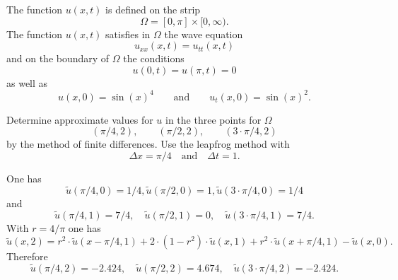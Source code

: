 The function $u(x,t)$ is defined on the strip 
\[
\Omega = [0, \pi] \times [0,\infty).
\]
The function $u(x,t)$ satisfies in $\Omega$ the wave equation
\[
u_{xx}(x,t) = u_{tt}(x,t)
\]
and on the boundary of $\Omega$ the conditions 
\[
u(0,t) = u(\pi,t) = 0
\]
as well as
\[
u(x,0) = \sin(x)^4
\qquad\mbox{and} \qquad
u_t(x,0) = \sin(x)^2.
\]

Determine approximate values for $u$ in the three points for $\Omega$
\[
(\pi/4,2), \qquad
(\pi/2,2), \qquad
(3 \cdot \pi/4,2)
\]
by the method of finite differences. Use the leapfrog method with 
\[
\Delta x = \pi/4 \quad \text{and} \quad  \Delta t = 1.
\]

\begin{loesung}
One has
\[
\tilde u(\pi/4,0) = 1/4,
\tilde u(\pi/2,0) = 1,
\tilde u(3 \cdot \pi/4,0) = 1/4
\]
and
\[
\tilde u(\pi/4,1) = 7/4,\quad
\tilde u(\pi/2,1) = 0,\quad
\tilde u(3 \cdot \pi/4,1) = 7/4.
\]
With $r = 4/\pi$ one has
\[
\tilde u(x, 2)
=
r^2 \cdot \tilde u(x - \pi/4, 1)
+ 2 \cdot (1 - r^2) \cdot \tilde u(x,1) + r^2 \cdot \tilde u(x + \pi/4, 1)
- \tilde u(x,0).
\]
Therefore
\[
\tilde u(\pi/4,2) = -2.424,\quad
\tilde u(\pi/2,2) = 4.674,\quad
\tilde u(3 \cdot \pi/4,2) = -2.424.
\]
\end{loesung}

